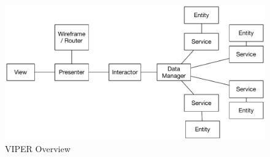 \begin{figure}[H]
    \centering
    \includegraphics[width=\textwidth,keepaspectratio]{assets/concept/viper.pdf}
    \caption{VIPER Overview}
    \label{fig:viper}
\end{figure}

